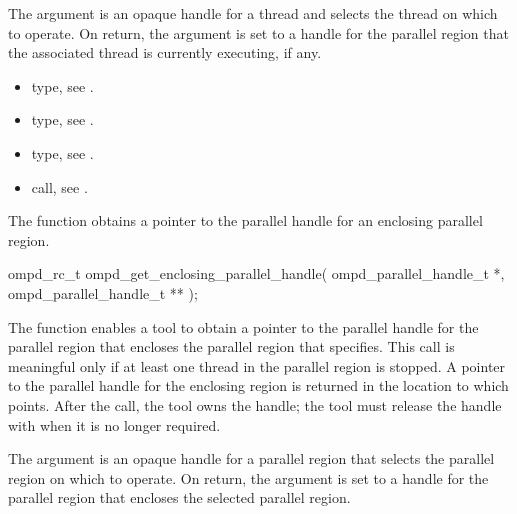 \argdesc
The  argument is an opaque handle for a thread and selects 
the thread on which to operate. On return, the  
argument is set to a handle for the parallel region that the associated thread 
is currently executing, if any.

\crossreferences
\begin{itemize}
\item {} type, 
see .

\item {} type, 
see .

\item {} type, see .

\item {} call, 
see .
\end{itemize}



\label{subsubsubsec:ompd_get_enclosing_parallel_handle}

\summary
The   function obtains a pointer 
to the parallel handle for an enclosing parallel region.

\format
\begin{cspecific}
\begin{ompSyntax}
ompd_rc_t ompd_get_enclosing_parallel_handle(
  ompd_parallel_handle_t *,
  ompd_parallel_handle_t **
);
\end{ompSyntax}
\end{cspecific}

\descr
The   function enables a tool 
to obtain a pointer to the parallel handle for the parallel region that
encloses the parallel region that  specifies. This 
call is meaningful only if at least one thread in the parallel region 
is stopped. A pointer to the parallel handle for the enclosing region 
is returned in the location to which 
points. After the call, the tool owns the handle; the tool must release the 
handle with  when it is no longer required.

\argdesc
The  argument is an opaque handle for a parallel 
region that selects the parallel region on which to operate. On return, 
the  argument is set to a handle for the 
parallel region that encloses the selected parallel region.

